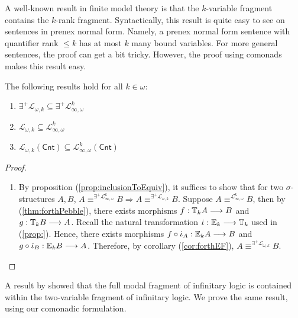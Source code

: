 A well-known result in finite model theory is that the $k$-variable fragment contains the $k$-rank fragment. Syntactically, this result is quite easy to see on sentences in prenex normal form. Namely, a prenex normal form sentence with quantifier rank $\leq k$ has at most $k$ many bound variables. For more general sentences, the proof can get a bit tricky. However, the proof using comonads makes this result easy. 
\begin{prop} The following results hold for all $k \in \omega$:
\begin{enumerate}[label=(\arabic*)]
\item $\exists^{+}\mathcal{L}_{\omega,k} \subseteq \exists^{+}\mathcal{L}^{k}_{\infty,\omega}$
\item $\mathcal{L}_{\omega,k} \subseteq \mathcal{L}^{k}_{\infty,\omega}$
\item $\mathcal{L}_{\omega,k}(\mathsf{Cnt}) \subseteq \mathcal{L}^{k}_{\infty,\omega}(\mathsf{Cnt})$
\end{enumerate}
\begin{proof}
\begin{enumerate}[label=(\arabic*)]
\item By proposition (\ref{prop:inclusionToEquiv}), it suffices to show that for two $\sigma$-structures $A,B$, $A \equiv^{\exists^{+}\mathcal{L}^{k}_{\infty,\omega}} B \Rightarrow A \equiv^{\exists^{+}\mathcal{L}_{\omega,k}} B$. Suppose $A \equiv^{\mathcal{L}^{k}_{\infty,\omega}} B$, then by (\ref{thm:forthPebble}), there exists morphisms $f:{\mathbb{T}_{k}A} \longrightarrow B$ and $g:{\mathbb{T}_{k}B} \longrightarrow A$. Recall the natural transformation $\iota:\efcomonad{k}{} \longrightarrow \pcomonad{k}{}$ used in (\ref{prop:}). Hence, there exists morphisms $f \circ \iota_{A}:\efcomonad{k}{A} \longrightarrow B$ and $g \circ \iota_{B}:\efcomonad{k}{B} \longrightarrow A$. Therefore, by corollary (\ref{cor:forthEF}), $A \equiv^{\exists^{+}\mathcal{L}_{\omega,k}} B$.    
\end{enumerate}
\end{proof}
\end{prop}
A result by \cite{Gabbay1981} showed that the full modal fragment of infinitary logic is contained within the two-variable fragment of infinitary logic. We prove the same result, using our comonadic formulation.
